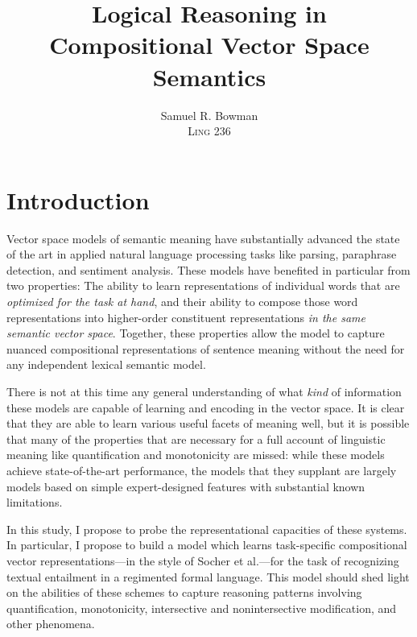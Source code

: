 \documentclass[12pt,leqno,tbtags,twoside]{article}
\title{\Large Logical Reasoning in Compositional Vector Space Semantics}
\author{Samuel R. Bowman\\\textsc{Ling 236}}
\theoremstyle{dotless}
\begin{document}
\maketitle


\def\Y{\textbabygamma}
\def\P{\textceltpal}
\def\Rs{\textsubwedge} %
\def\E{\tipaloweraccent[.1ex]{8}{e}} %
\def\A{\sublptr{\"{a}}}

\maketitle





\section{Introduction}

Vector space models of semantic meaning have  substantially advanced the state of the art in applied natural language processing tasks like parsing, paraphrase detection, and sentiment analysis. These models have benefited in particular from two properties: The ability to learn representations of individual words that are \textit{optimized for the task at hand}, and their ability to compose those word representations into higher-order constituent representations \textit{in the same semantic vector space}. Together, these properties allow the model to capture nuanced compositional representations of sentence meaning without the need for any independent lexical semantic model.

There is not at this time any general understanding of what \textit{kind} of information these models are capable of learning and encoding in the vector space. It is clear that they are able to learn various useful facets of meaning well, but it is possible that many of the properties that are necessary for a full account of linguistic meaning like quantification and monotonicity are missed: while these models achieve state-of-the-art performance, the models that they supplant are largely models based on simple expert-designed features with substantial known limitations.

In this study, I propose to probe the representational capacities of these systems. In particular, I propose to build a model which learns task-specific compositional vector representations---in the style of Socher et al.---for the task of recognizing textual entailment in a regimented formal language. This model should shed light on the abilities of these schemes to capture reasoning patterns involving quantification, monotonicity, intersective and nonintersective modification, and other phenomena.
\end{document}
